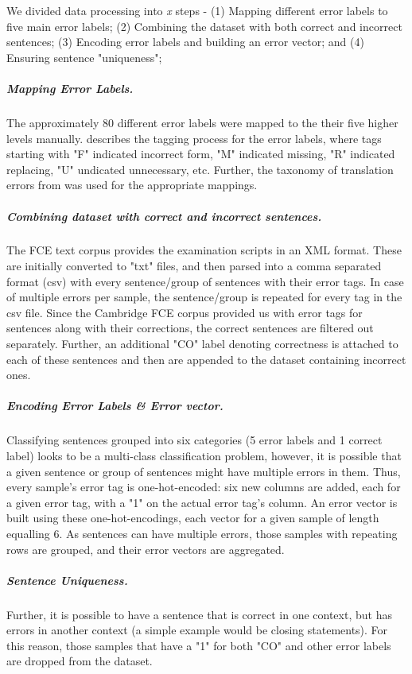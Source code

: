 We divided data processing into \emph{x} steps -
    (1) Mapping different error labels to five main error labels;
    (2) Combining the dataset with both correct and incorrect sentences; 
    (3) Encoding error labels and building an error vector; and
    (4) Ensuring sentence "uniqueness";

\subparagraph{Mapping Error Labels.}
The approximately 80 different error labels were mapped to the their five higher 
levels manually. \cite{NichollsFce} describes the tagging process for the error labels, 
where tags starting with "F" indicated incorrect form, "M" indicated missing, "R" indicated replacing,
"U" undicated unnecessary, etc. Further, the taxonomy of translation errors from \cite{costaTaxonomyErrorLabels}
was used for the appropriate mappings. 

\subparagraph{Combining dataset with correct and incorrect sentences.}
The FCE text corpus provides the examination scripts in an XML format. These are initially converted to "txt" files, 
and then parsed into a comma separated format (csv) with every sentence/group of sentences with their error tags. 
In case of multiple errors per sample, the sentence/group is repeated for every tag in the csv file. 
Since the Cambridge FCE corpus provided us with error tags for sentences along with their 
corrections, the correct sentences are filtered out separately. Further, an additional "CO" label denoting correctness
is attached to each of these sentences and then are appended to the dataset containing incorrect ones.

\subparagraph{Encoding Error Labels \& Error vector.}
Classifying sentences grouped into six categories (5 error labels and 1 correct label) looks to be a multi-class 
classification problem, however, it is possible that a given sentence or group of sentences might have multiple errors 
in them. Thus, every sample's error tag is one-hot-encoded: six new columns are added, each for a given error tag, with 
a "1" on the actual error tag's column. An error vector is built using these one-hot-encodings, each vector for a given sample 
of length equalling 6. As sentences can have multiple errors, those samples with repeating rows are grouped, and their 
error vectors are aggregated. 

\subparagraph{Sentence Uniqueness.}
Further, it is possible to have a sentence that is correct in one context, but has errors in 
another context (a simple example would be closing statements). For this reason, those samples that have a "1" for both "CO" and 
other error labels are dropped from the dataset. 